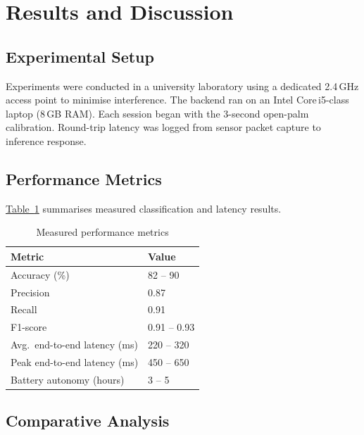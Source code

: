 \documentclass[conference]{IEEEtran}
\newcommand{\TabLink}[1]{\hyperref[#1]{Table~\ref*{#1}}}
\begin{document}
\section{Results and Discussion}

\subsection{Experimental Setup}

Experiments were conducted in a university laboratory using a dedicated 2.4\,GHz
access point to minimise interference. The backend ran on an Intel Core\,i5-class
laptop (8\,GB RAM). Each session began with the 3-second open-palm calibration.
Round-trip latency was logged from sensor packet capture to inference response.

\subsection{Performance Metrics}

\TabLink{tab:metrics} summarises measured classification and latency results.

\begin{table}[!t]
  \centering\caption{Measured performance metrics}\label{tab:metrics}
  \begin{tabularx}{\columnwidth}{@{}lX@{}}
    \toprule Metric & Value \\\midrule
    Accuracy (\%)                 & 82 -- 90 \\
    Precision                     & 0.87 \\
    Recall                        & 0.91 \\
    F1-score                      & 0.91 -- 0.93 \\
    Avg.\ end-to-end latency (ms) & 220 -- 320 \\
    Peak end-to-end latency (ms)  & 450 -- 650 \\
    Battery autonomy (hours)      & 3 -- 5 \\
    \bottomrule
  \end{tabularx}
\end{table}

\subsection{Comparative Analysis}
\end{document}
